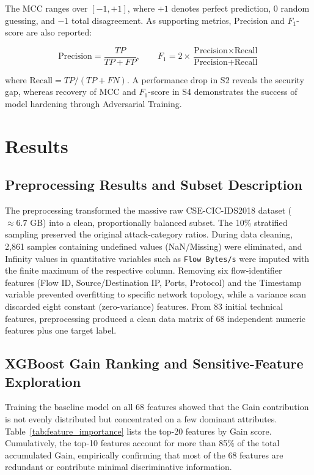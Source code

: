 \documentclass[11pt, a4paper]{article}
\begin{document}
The MCC ranges over $[-1, +1]$, where $+1$ denotes perfect prediction, $0$ random guessing, and $-1$ total disagreement. As supporting metrics, Precision and $F_1$-score are also reported:

\begin{equation}
\text{Precision} = \frac{TP}{TP + FP}, \qquad
F_1 = 2 \times \frac{\text{Precision} \times \text{Recall}}{\text{Precision} + \text{Recall}}
\end{equation}

where $\text{Recall} = TP/(TP + FN)$. A performance drop in S2 reveals the security gap, whereas recovery of MCC and $F_1$-score in S4 demonstrates the success of model hardening through Adversarial Training.

\section{Results}

\subsection{Preprocessing Results and Subset Description}
The preprocessing transformed the massive raw CSE-CIC-IDS2018 dataset ($\approx 6.7$ GB) into a clean, proportionally balanced subset. The 10\% stratified sampling preserved the original attack-category ratios. During data cleaning, 2{,}861 samples containing undefined values (NaN/Missing) were eliminated, and Infinity values in quantitative variables such as \texttt{Flow Bytes/s} were imputed with the finite maximum of the respective column. Removing six flow-identifier features (Flow ID, Source/Destination IP, Ports, Protocol) and the Timestamp variable prevented overfitting to specific network topology, while a variance scan discarded eight constant (zero-variance) features. From 83 initial technical features, preprocessing produced a clean data matrix of 68 independent numeric features plus one target label.

\subsection{XGBoost Gain Ranking and Sensitive-Feature Exploration}
Training the baseline model on all 68 features showed that the Gain contribution is not evenly distributed but concentrated on a few dominant attributes. Table~\ref{tab:feature_importance} lists the top-20 features by Gain score. Cumulatively, the top-10 features account for more than 85\% of the total accumulated Gain, empirically confirming that most of the 68 features are redundant or contribute minimal discriminative information.
\end{document}

